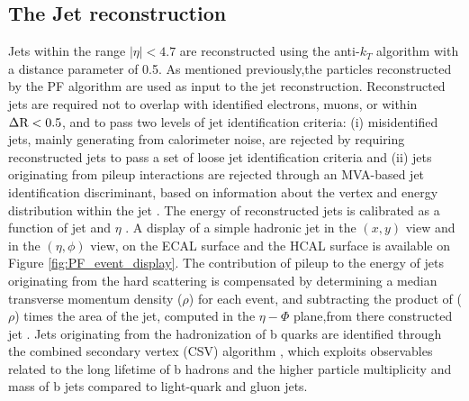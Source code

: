 \subsection {The Jet reconstruction}

Jets within the range \ensuremath{|\eta| < 4.7} are reconstructed using the anti-\ensuremath{k_{T}} algorithm \cite{antikt} with a distance parameter of 0.5. As mentioned previously,the particles reconstructed by the PF algorithm are used as input to the jet reconstruction. Reconstructed jets are required not to overlap with identified electrons, muons, or \hadtau within \ensuremath{\deltar < 0.5}, and to pass two levels of jet identification criteria: (i) misidentified jets, mainly generating from calorimeter noise, are rejected by requiring reconstructed jets to pass a set of loose jet identification criteria \cite{CMS:2010xta} and (ii) jets originating from pileup interactions are rejected through an MVA-based jet identification discriminant, based on information about the vertex and energy distribution within the jet \cite{CMS:2013wea}. The energy of reconstructed jets is calibrated as a function of jet \pt and \ensuremath{\eta} \cite{1748-0221-6-11-P11002}. A display of a simple hadronic jet in the $(x, y)$ view and in the $(\eta,\phi)$ view, on the ECAL surface and the HCAL surface is available on Figure 	\ref{fig:PF_event_display}. The contribution of pileup to the energy of jets originating from the hard scattering is compensated by determining a median transverse momentum density (\ensuremath{\rho}) for each event, and subtracting the product of (\ensuremath{\rho}) times the area of the jet, computed in the \ensuremath{\eta-\Phi} plane,from there constructed jet \pt \cite{Cacciari:2008gn, Cacciari:2007fd}. Jets originating from the hadronization of b quarks are identified through the combined secondary vertex (CSV) algorithm \cite{Chatrchyan:2012jua}, which exploits observables related to the long lifetime of b hadrons and the higher particle multiplicity and mass of b jets compared to light-quark and gluon jets.

